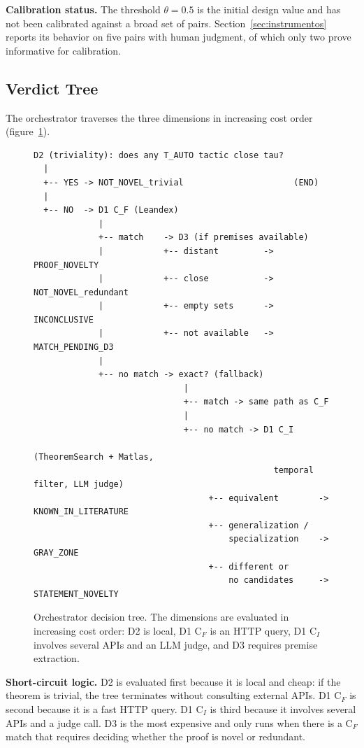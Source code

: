 \documentclass{article}
\theoremstyle{remark}
\begin{document}
\textbf{Calibration status.} The threshold $\theta = 0.5$ is the initial design value and has not been calibrated against a broad set of pairs. Section~\ref{sec:instrumentos} reports its behavior on five pairs with human judgment, of which only two prove informative for calibration.

\subsection{Verdict Tree}

The orchestrator traverses the three dimensions in increasing cost order (figure~\ref{fig:arbol}).

\begin{figure}[htbp]
\centering
\small
\begin{verbatim}
D2 (triviality): does any T_AUTO tactic close tau?
  |
  +-- YES -> NOT_NOVEL_trivial                      (END)
  |
  +-- NO  -> D1 C_F (Leandex)
             |
             +-- match    -> D3 (if premises available)
             |            +-- distant         -> PROOF_NOVELTY
             |            +-- close           -> NOT_NOVEL_redundant
             |            +-- empty sets      -> INCONCLUSIVE
             |            +-- not available   -> MATCH_PENDING_D3
             |
             +-- no match -> exact? (fallback)
                              |
                              +-- match -> same path as C_F
                              |
                              +-- no match -> D1 C_I
                                               (TheoremSearch + Matlas,
                                                temporal filter, LLM judge)
                                   +-- equivalent        -> KNOWN_IN_LITERATURE
                                   +-- generalization /
                                       specialization    -> GRAY_ZONE
                                   +-- different or
                                       no candidates     -> STATEMENT_NOVELTY
\end{verbatim}
\caption{Orchestrator decision tree. The dimensions are evaluated in increasing cost order: D2 is local, D1 C$_F$ is an HTTP query, D1 C$_I$ involves several APIs and an LLM judge, and D3 requires premise extraction.}
\label{fig:arbol}
\end{figure}

\textbf{Short-circuit logic.} D2 is evaluated first because it is local and cheap: if the theorem is trivial, the tree terminates without consulting external APIs. D1 C$_F$ is second because it is a fast HTTP query. D1 C$_I$ is third because it involves several APIs and a judge call. D3 is the most expensive and only runs when there is a C$_F$ match that requires deciding whether the proof is novel or redundant.
\end{document}
